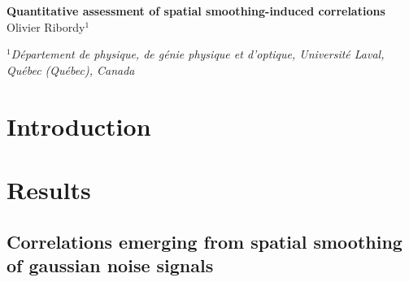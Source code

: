 \documentclass{article}
\begin{document}
\begin{center}

    {\Large \textbf{Quantitative assessment of spatial smoothing-induced correlations}}\\
    
    \vspace{10 pt}
    Olivier Ribordy$^{1}$ \\
    \vspace{5 pt}
    
    $^1$\textit{Département de physique, de génie physique et d'optique, Université Laval, Québec (Québec), Canada}
    

\end{center}

\vspace{10 pt}

\begin{multicols}{2}

\section*{Introduction}



\section*{Results}


\subsection*{Correlations emerging from spatial smoothing of gaussian noise signals}


\end{multicols}
\end{document}
